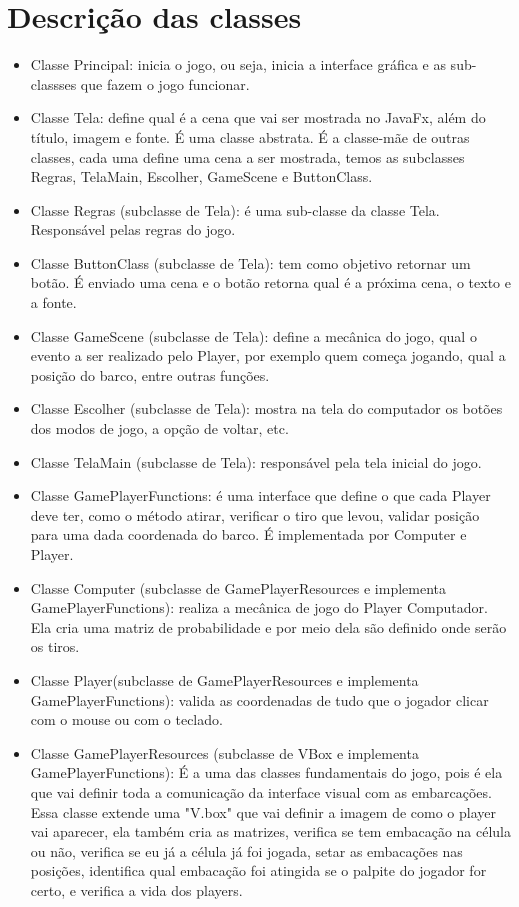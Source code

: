 \documentclass[]{article}
\begin{document}
\section{Descrição das classes}
\begin{itemize}
	\item Classe Principal: inicia o jogo, ou seja,  inicia a interface gráfica e as sub-classses que fazem o jogo funcionar.
	
    \item Classe Tela: define qual é a cena que vai ser mostrada no JavaFx, além do título, imagem e fonte. É uma classe abstrata. É a classe-mãe de outras classes, cada uma define uma cena a ser mostrada, temos as subclasses Regras, TelaMain, Escolher, GameScene e ButtonClass.
    \item Classe Regras (subclasse de Tela): é uma sub-classe da classe Tela. Responsável pelas regras do jogo.
    \item Classe ButtonClass (subclasse de Tela): tem como objetivo retornar um botão. É enviado uma cena e o botão retorna qual é a próxima cena, o texto e a fonte.
    \item Classe GameScene (subclasse de Tela): define a mecânica do jogo, qual o evento a ser realizado pelo Player, por exemplo quem começa jogando, qual a posição do barco, entre outras funções.
    \item Classe Escolher (subclasse de Tela): mostra na tela do computador os botões dos modos de jogo, a opção de voltar, etc.
    \item Classe TelaMain (subclasse de Tela): responsável pela tela inicial do jogo.
    \item Classe GamePlayerFunctions: é uma interface que define o que cada Player deve ter, como o método atirar, verificar o tiro que levou, validar posição para uma dada coordenada do barco. É implementada por Computer e Player.
    \item Classe Computer (subclasse de GamePlayerResources e implementa GamePlayerFunctions): realiza a mecânica de jogo do Player Computador. Ela cria uma matriz de probabilidade e por meio dela são definido onde serão os tiros. 
    \item Classe Player(subclasse de GamePlayerResources e implementa GamePlayerFunctions): valida as coordenadas de tudo que o jogador clicar com o mouse ou com o teclado.
	\item Classe GamePlayerResources (subclasse de VBox e implementa GamePlayerFunctions): É a uma das classes fundamentais do jogo, pois é ela que vai definir toda a comunicação da interface visual com as embarcações. Essa classe extende uma "V.box" que vai definir a imagem de como o player vai aparecer, ela também cria as matrizes, verifica se tem embacação na célula ou não, verifica se eu já a célula já foi jogada, setar as embacações nas posições, identifica qual embacação foi atingida se o palpite do jogador for certo, e verifica a vida dos players.   

\end{itemize}
\end{document}
